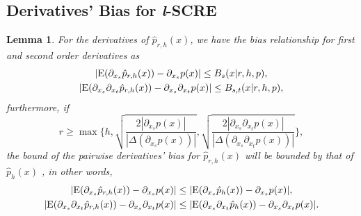 \documentclass[aos,preprint]{imsart}
\newtheorem{lemma}[theorem]{Lemma}
\theoremstyle{remark}
\begin{document}
\begin{appendix}
\subsection{Derivatives' Bias for {\it l}-SCRE}
\begin{lemma} \label{lSCRE}For the derivatives of $\hat{p}_{r,h}(x)$, we have the bias relationship for first and second order derivatives as
\begin{gather*}\label{order11}
|{\rm E}( \partial_{x_s}  \hat{p}_{r,h}(x)) -  \partial_{x_s } p(x)|  \leq B_s(x| r,h, p)  ,\\
|{\rm E} (\partial_{x_s} \partial_{x_t}   \hat{p}_{r, h}(x)) -  \partial_{x_s} \partial_{x_t} p(x)| \leq B_{s,t}(x| r,h, p),
\end{gather*}
furthermore, if  
\begin{equation}\label{condition1}
r \geq\max \{ h, \sqrt{\frac{2|\partial_{x_s} p(x)|}{ |\Delta(\partial_{x_s} p(x))|}} , \sqrt{\frac{2|\partial_{x_s} \partial_{x_t} p(x)|}{ |\Delta(\partial_{x_s}\partial_{x_t} p(x))|}}\},
\end{equation}
the bound of the pairwise derivatives' bias for $\hat{p}_{r,h}(x)$ %
will be bounded by that of $\hat{p}_h(x)$%
, in other words,
\begin{gather*}\label{bias_bound2}
|{\rm E}( \partial_{x_s}  \hat{p}_{r,h}(x)) -  \partial_{x_s } p(x)| \leq |{\rm E}( \partial_{x_s}  \hat{p}_{h}(x)) -  \partial_{x_s } p(x)|,\\
|{\rm E}( \partial_{x_s} \partial_{x_t} \hat{p}_{r,h}(x)) - \partial_{x_s} \partial_{x_t} p(x)| \leq |{\rm E}( \partial_{x_s}  \partial_{x_t} \hat{p}_{h}(x)) -  \partial_{x_s }\partial_{x_t} p(x)|.
\end{gather*}
\end{lemma}


\end{appendix}
\end{document}
